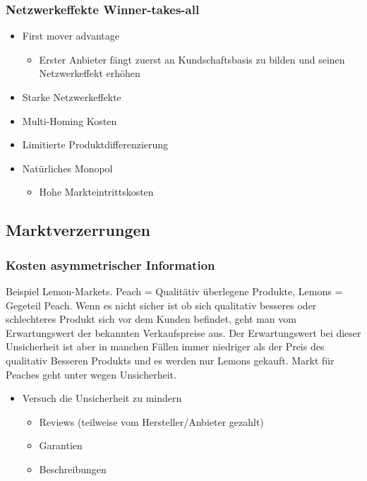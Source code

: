 \subsubsection{Netzwerkeffekte Winner-takes-all}

\begin{itemize}
    \item First mover advantage
    \begin{itemize}
        \item Erster Anbieter fängt zuerst an Kundschaftsbasis zu bilden und seinen Netzwerkeffekt erhöhen
    \end{itemize}
    \item Starke Netzwerkeffekte
    \item Multi-Homing Kosten
    \item Limitierte Produktdifferenzierung
    \item Natürliches Monopol 
    \begin{itemize}
        \item Hohe Markteintrittskosten 
    \end{itemize}
\end{itemize}

\subsection{Marktverzerrungen}
\subsubsection{ Kosten asymmetrischer Information}
Beispiel Lemon-Markets. Peach = Qualitätiv überlegene Produkte, Lemons = Gegeteil Peach.
Wenn es nicht sicher ist ob sich qualitativ besseres oder schlechteres Produkt sich vor dem Kunden befindet,
 geht man vom Erwartungswert der bekannten Verkaufspreise aus. Der Erwartungswert bei dieser Unsicherheit ist aber in manchen Fällen immer niedriger als der
 Preis des qualitativ Besseren Produkts und es werden nur Lemons gekauft. Markt für Peaches geht unter wegen Unsicherheit.
 
\begin{itemize}
    \item Versuch die Unsicherheit zu mindern
    \begin{itemize}
        \item Reviews (teilweise vom Hersteller/Anbieter gezahlt)
        \item Garantien
        \item Beschreibungen
    \end{itemize}
\end{itemize}

